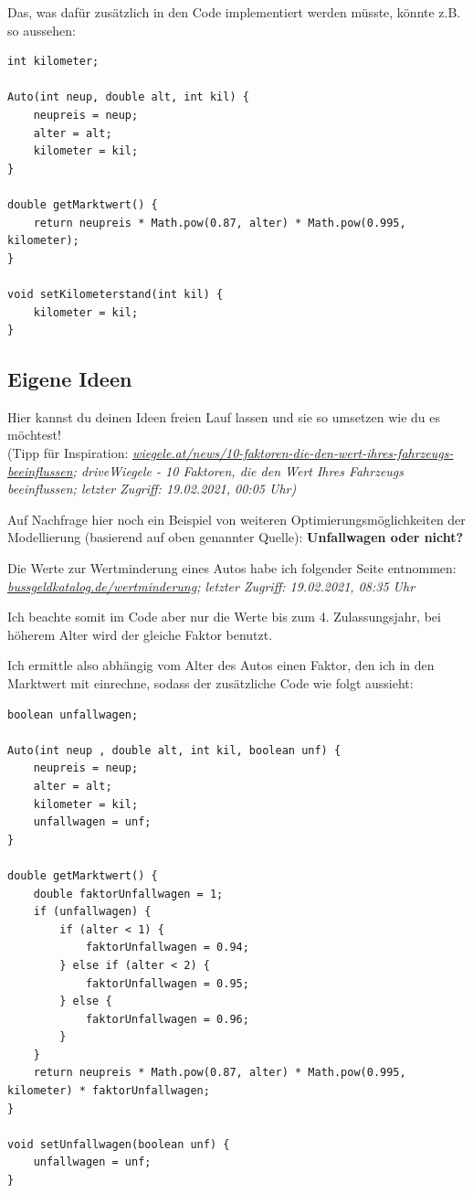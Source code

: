 \documentclass{scrartcl}   %
\begin{document}
Das, was dafür zusätzlich in den Code implementiert werden müsste, könnte z.B. so aussehen:

\begin{lstlisting}
int kilometer;

Auto(int neup, double alt, int kil) {
    neupreis = neup;
    alter = alt;
    kilometer = kil;
}

double getMarktwert() {
    return neupreis * Math.pow(0.87, alter) * Math.pow(0.995, kilometer);
}

void setKilometerstand(int kil) {
    kilometer = kil;
}
\end{lstlisting}

\subsection{Eigene Ideen}

Hier kannst du deinen Ideen freien Lauf lassen und sie so umsetzen wie du es möchtest!\\
(Tipp für Inspiration: \textit{\href{https://www.wiegele.at/news/10-faktoren-die-den-wert-ihres-fahrzeugs-beeinflussen}{wiegele.at/news/10-faktoren-die-den-wert-ihres-fahrzeugs-beeinflussen}; driveWiegele - 10 Faktoren, die den Wert Ihres Fahrzeugs beeinflussen; letzter Zugriff: 19.02.2021, 00:05 Uhr)}

Auf Nachfrage hier noch ein Beispiel von weiteren Optimierungsmöglichkeiten der Modellierung (basierend auf oben genannter Quelle): \textbf{Unfallwagen oder nicht?}

Die Werte zur Wertminderung eines Autos habe ich folgender Seite entnommen:\\ \textit{\href{https://www.bussgeldkatalog.de/wertminderung/}{bussgeldkatalog.de/wertminderung}; letzter Zugriff: 19.02.2021, 08:35 Uhr}

Ich beachte somit im Code aber nur die Werte bis zum 4. Zulassungsjahr, bei höherem Alter wird der gleiche Faktor benutzt.

Ich ermittle also abhängig vom Alter des Autos einen Faktor, den ich in den Marktwert mit einrechne, sodass der zusätzliche Code wie folgt aussieht:\\

\begin{lstlisting}
boolean unfallwagen;

Auto(int neup , double alt, int kil, boolean unf) {
    neupreis = neup;
    alter = alt;
    kilometer = kil;
    unfallwagen = unf;
}

double getMarktwert() {
    double faktorUnfallwagen = 1;
    if (unfallwagen) {
        if (alter < 1) {
            faktorUnfallwagen = 0.94;
        } else if (alter < 2) {
            faktorUnfallwagen = 0.95;
        } else {
            faktorUnfallwagen = 0.96;
        } 
    }
    return neupreis * Math.pow(0.87, alter) * Math.pow(0.995, kilometer) * faktorUnfallwagen;
}

void setUnfallwagen(boolean unf) {
    unfallwagen = unf;
}
\end{lstlisting}
\end{document}
